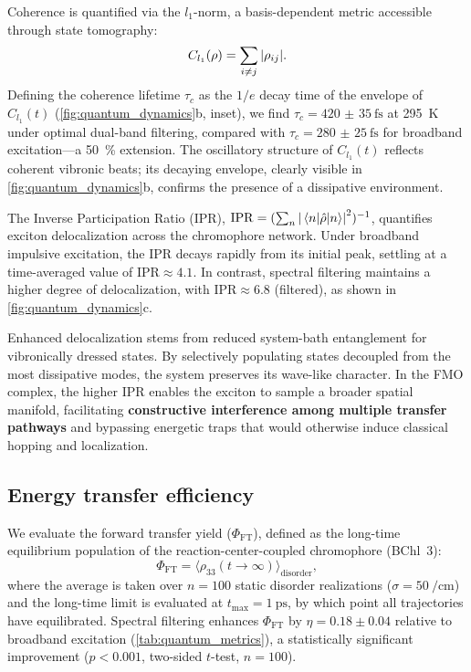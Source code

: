 \documentclass[journal=jpcl,manuscript=letter]{achemso}
\begin{document}
Coherence is quantified via the $l_1$-norm,\cite{Baumgratz2014} a basis-dependent metric accessible through state tomography:
\begin{equation}
C_{l_1}(\rho) = \sum_{i \neq j} \abs{\rho_{ij}}.
\label{eq:l1_coherence}
\end{equation}
Defining the coherence lifetime $\tau_c$ as the $1/e$ decay time of the envelope of $C_{l_1}(t)$ (\cref{fig:quantum_dynamics}b, inset), we find $\tau_c = \SI{420(35)}{\femto\second}$ at \SI{295}{\kelvin} under optimal dual-band filtering, compared with $\tau_c = \SI{280(25)}{\femto\second}$ for broadband excitation---a \SI{50}{\percent} extension. The oscillatory structure of $C_{l_1}(t)$ reflects coherent vibronic beats; its decaying envelope, clearly visible in \cref{fig:quantum_dynamics}b, confirms the presence of a dissipative environment.

The Inverse Participation Ratio (IPR), $\mathrm{IPR} = (\sum_n \abs{\mel{n}{\hat{\rho}}{n}}^2)^{-1}$, quantifies exciton delocalization across the chromophore network. Under broadband impulsive excitation, the IPR decays rapidly from its initial peak, settling at a time-averaged value of $\mathrm{IPR} \approx \num{4.1}$. In contrast, spectral filtering maintains a higher degree of delocalization, with $\mathrm{IPR} \approx \num{6.8}$ (filtered), as shown in \cref{fig:quantum_dynamics}c. 

Enhanced delocalization stems from reduced system-bath entanglement for vibronically dressed states. By selectively populating states decoupled from the most dissipative modes, the system preserves its wave-like character. In the FMO complex, the higher IPR enables the exciton to sample a broader spatial manifold, facilitating \textbf{constructive interference among multiple transfer pathways} and bypassing energetic traps that would otherwise induce classical hopping and localization.

\subsection*{Energy transfer efficiency}

We evaluate the forward transfer yield ($\Phi_{\mathrm{FT}}$), defined as the long-time equilibrium population of the reaction-center-coupled chromophore (BChl~3):
\begin{equation}
\Phi_{\mathrm{FT}} = \bigl\langle \rho_{33}(t \to \infty) \bigr\rangle_{\mathrm{disorder}},
\label{eq:ETE}
\end{equation}
where the average is taken over $n=100$ static disorder realizations ($\sigma = \SI{50}{\per\centi\meter}$) and the long-time limit is evaluated at $t_{\max} = \SI{1}{\pico\second}$, by which point all trajectories have equilibrated. Spectral filtering enhances $\Phi_{\mathrm{FT}}$ by $\eta = 0.18 \pm 0.04$ relative to broadband excitation (\cref{tab:quantum_metrics}), a statistically significant improvement ($p < 0.001$, two-sided $t$-test, $n=100$).
\end{document}
